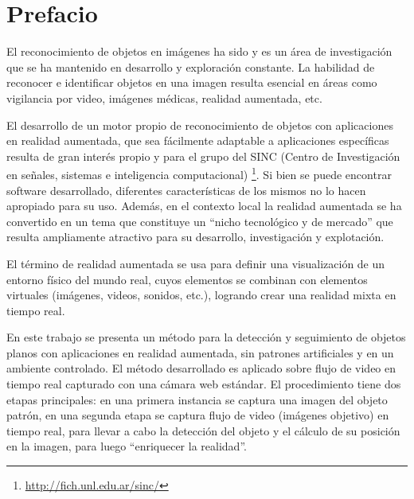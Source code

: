 \chapter*{Prefacio}

El reconocimiento de objetos en imágenes ha sido y es un área de investigación que se ha mantenido en desarrollo y exploración constante. La habilidad de reconocer e identificar objetos en una imagen resulta esencial en áreas como vigilancia por video, imágenes médicas, realidad aumentada, etc.

El desarrollo de un motor propio de reconocimiento de objetos con aplicaciones en realidad aumentada, que sea fácilmente adaptable a aplicaciones específicas resulta de gran interés propio y para el grupo del SINC (Centro de Investigación en señales, sistemas e inteligencia computacional) \footnote{\url{http://fich.unl.edu.ar/sinc/}}. Si bien se puede encontrar software desarrollado, diferentes características de los mismos no lo hacen apropiado para su uso. Además, en el contexto local la realidad aumentada se ha convertido en un tema que constituye un ``nicho tecnológico y de mercado'' que resulta ampliamente atractivo para su desarrollo, investigación y explotación.

El término de realidad aumentada se usa para definir una visualización de un entorno físico del mundo real, cuyos elementos se combinan con elementos virtuales (imágenes, videos, sonidos, etc.), logrando crear una realidad mixta en tiempo real.

En este trabajo se presenta un método para la detección y seguimiento de objetos planos con aplicaciones en realidad aumentada, sin patrones artificiales y en un ambiente controlado. El método desarrollado es aplicado sobre flujo de video en tiempo real capturado con una cámara web estándar. El procedimiento tiene dos etapas principales: en una primera instancia se captura una imagen del objeto patrón, en una segunda etapa se captura flujo de video (imágenes objetivo) en tiempo real, para llevar a cabo la detección del objeto y el cálculo de su posición en la imagen, para luego ``enriquecer la realidad''.

